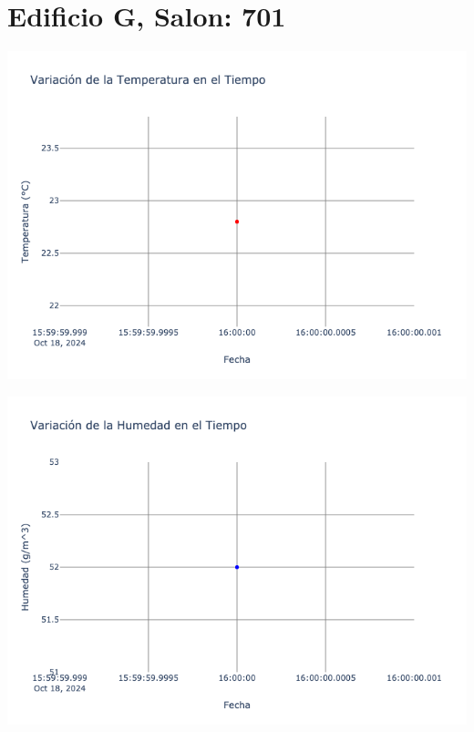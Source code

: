 \documentclass{article}
\begin{document}
    \section{Edificio G, Salon: 701}
    \noindent
    \begin{minipage}{0.48\textwidth}
        \centering
        \includegraphics[width=\textwidth]{../img/poli/TS701-90Dias-03-12-2024.png}
    \end{minipage}
    \hfill
    \begin{minipage}{0.48\textwidth}
        \centering
        \includegraphics[width=\textwidth]{../img/poli/HS701-90Dias-03-12-2024.png}
    \end{minipage}
\end{document}
